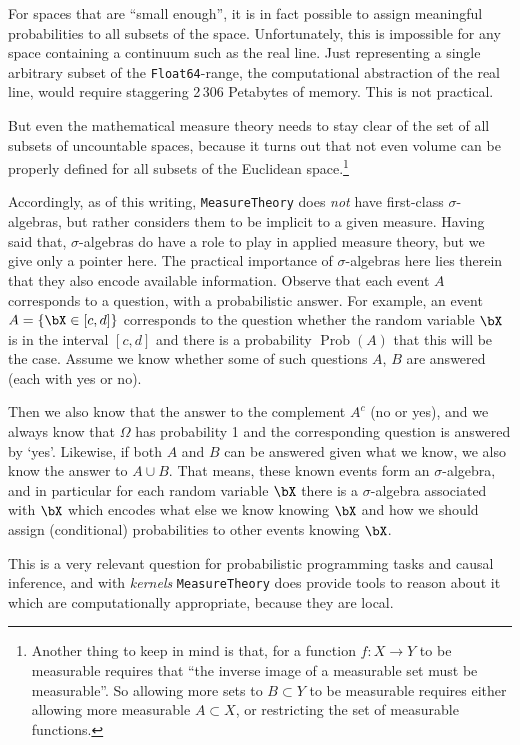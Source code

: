 \documentclass{juliacon}
\begin{document}
For spaces that are ``small enough'', it is in fact possible to assign meaningful probabilities to all subsets of the space. Unfortunately, this is impossible for any space containing a continuum such as the real line. Just representing a single arbitrary subset of the \verb|Float64|-range, the computational abstraction of the real line, would require staggering 2\,306 Petabytes of memory. This is not practical.

But even the mathematical measure theory needs to stay clear of the set of all subsets of uncountable spaces, because it turns out that not even volume can be properly defined for all subsets of the Euclidean space.\footnote{Another thing to keep in mind is that, for a function $f\colon X \to Y$ to be measurable requires that ``the inverse image of a measurable set must be measurable''. So allowing more sets to $B\subset Y$ to be measurable requires either allowing more measurable $A\subset X$, or restricting the set of measurable functions.}


Accordingly, as of this writing, \verb|MeasureTheory| does \emph{not} have first-class $\sigma$-algebras, but rather considers them to be implicit to a given measure. 
Having said that, $\sigma$-algebras do have a role to play in applied measure theory, but we give only a pointer here. 
The practical importance of $\sigma$-algebras here lies therein that they also encode available information. Observe that each event $A$ corresponds to a question, with a probabilistic answer. 
 For example, an event $A = \{\bX \in  [c, d]\}$ corresponds to the question whether the random variable $\bX$ is in the interval $[c, d]$ and there is a probability $\operatorname{Prob}(A)$ that this will be the case. 
 Assume we know whether some of such questions $A$, $B$ are answered (each with yes or no).
 
 Then we also know that the answer to the complement $A^c$ (no or yes), and we always know that $\Omega$ has probability 1 and the corresponding question is answered by `yes'. Likewise, if both $A$ and $B$ can be answered given what we know, we also know the answer to $A \cup B$. That means, these known events form an $\sigma$-algebra, and in particular for each random variable $\bX$ there is a $\sigma$-algebra associated with $\bX$ which encodes what else we know knowing $\bX$ and how we should assign (conditional) probabilities to other events knowing $\bX$.
 
 This is a very relevant question for probabilistic programming tasks and causal inference, and with \emph{kernels} \verb|MeasureTheory| does provide tools to reason about it which are computationally appropriate, because they are local.
 
\end{document}
